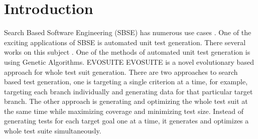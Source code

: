 \documentclass[sigconf]{acmart}
\begin{document}



\maketitle

\section{Introduction}
Search Based Software Engineering (SBSE) has numerous use cases \cite{10.1145/2379776.2379787,Harman2012}.
One of the exciting applications of SBSE is automated unit test generation. There several works on this
subject \cite{57624,6004309,10.1145/1276958.1277172,10.1145/1013886.1007528}. One of the methods of automated
unit test generation is using Genetic Algorithms. EVOSUITE \cite{6004309} EVOSUITE is 
a novel evolutionary based approach for whole test suit generation. There are two approaches to search 
based test generation, one is targeting a single criterion at a time, for example, targeting each branch
individually and generating data for that particular target branch. The other approach is generating and 
optimizing the whole test suit at the same time while maximizing coverage and minimizing test size. 
Instead of generating tests for each target goal one at a time, it generates and optimizes a whole test suite 
simultaneously. 
\end{document}
